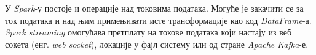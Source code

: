 \documentclass[12pt,oneside]{memoir}
\begin{document}
У \textit{Spark}-у постоје и операције над токовима података. Могуће је закачити се за ток података и над њим примењивати исте трансформације као код \textit{DataFrame}-а. \textit{Spark streaming} омогућава претплату на токове података који настају из веб сокета (енг. \textit{web socket}), локације у фајл систему или од стране \textit{Apache Kafka}-е. \cite{spark_streaming}

\end{document}
